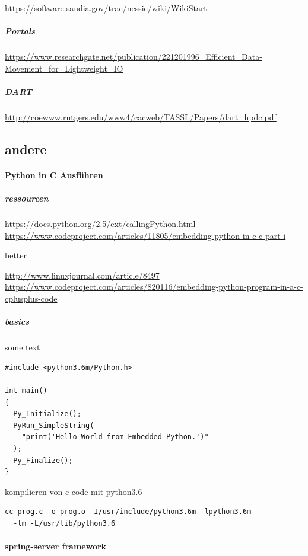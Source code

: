 \documentclass[a4paper,10pt]{article}
\numberwithin{figure}{section}
\numberwithin{table}{section}
\begin{document}
\url{https://software.sandia.gov/trac/nessie/wiki/WikiStart}

\subparagraph{Portals}

\url{https://www.researchgate.net/publication/221201996_Efficient_Data-Movement_for_Lightweight_IO}

\subparagraph{DART}

\url{http://coewww.rutgers.edu/www4/cacweb/TASSL/Papers/dart_hpdc.pdf}

\subsection{andere}

\paragraph{Python in C Ausführen}

\subparagraph{ressourcen}

\url{https://docs.python.org/2.5/ext/callingPython.html}
\url{https://www.codeproject.com/articles/11805/embedding-python-in-c-c-part-i}

better

\url{http://www.linuxjournal.com/article/8497}
\url{https://www.codeproject.com/articles/820116/embedding-python-program-in-a-c-cplusplus-code}

\subparagraph{basics}

some text

\begin{lstlisting}[frame=single,caption=Python in C ausführen, breaklines=true]
#include <python3.6m/Python.h>

int main()
{
  Py_Initialize();
  PyRun_SimpleString(
    "print('Hello World from Embedded Python.')"
  );
  Py_Finalize();
}
\end{lstlisting}

kompilieren von c-code mit python3.6

\begin{lstlisting}[frame=single,caption=Python in C kompilieren, breaklines=true]
cc prog.c -o prog.o -I/usr/include/python3.6m -lpython3.6m
  -lm -L/usr/lib/python3.6
\end{lstlisting}

\paragraph{spring-server framework}
\end{document}
